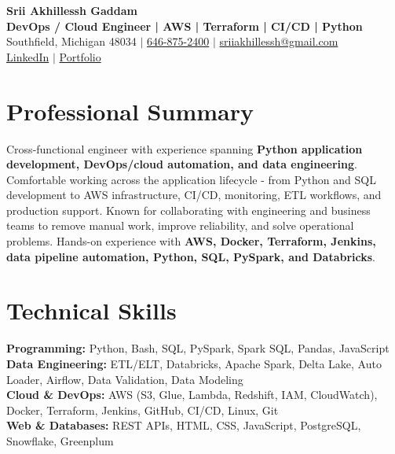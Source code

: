 \documentclass[letterpaper,10pt]{article}
\begin{document}
\fontsize{9.35pt}{10.45pt}\selectfont

\begin{center}
    {\LARGE \textbf{Srii Akhillessh Gaddam}} \\[-1pt]
    \textbf{DevOps / Cloud Engineer | AWS | Terraform | CI/CD | Python} \\[2pt]
    Southfield, Michigan 48034 $|$
    \href{tel:6468752400}{646-875-2400} $|$
    \href{mailto:sriiakhillessh@gmail.com}{sriiakhillessh@gmail.com} \\[1pt]
    \href{https://www.linkedin.com/in/srii-akhiilessh-gaddam-b48668191/}{LinkedIn} $|$
    \href{https://sriiakhillesshg.github.io/portfolio/}{Portfolio}
\end{center}
\vspace{-8pt}

\section{Professional Summary}
\small{Cross-functional engineer with experience spanning \textbf{Python application development, DevOps/cloud automation, and data engineering}. Comfortable working across the application lifecycle - from Python and SQL development to AWS infrastructure, CI/CD, monitoring, ETL workflows, and production support. Known for collaborating with engineering and business teams to remove manual work, improve reliability, and solve operational problems. Hands-on experience with \textbf{AWS, Docker, Terraform, Jenkins, data pipeline automation, Python, SQL, PySpark, and Databricks}.}

\section{Technical Skills}
\small{
\textbf{Programming:} Python, Bash, SQL, PySpark, Spark SQL, Pandas, JavaScript \\
\textbf{Data Engineering:} ETL/ELT, Databricks, Apache Spark, Delta Lake, Auto Loader, Airflow, Data Validation, Data Modeling \\
\textbf{Cloud \& DevOps:} AWS (S3, Glue, Lambda, Redshift, IAM, CloudWatch), Docker, Terraform, Jenkins, GitHub, CI/CD, Linux, Git \\
\textbf{Web \& Databases:} REST APIs, HTML, CSS, JavaScript, PostgreSQL, Snowflake, Greenplum
}
\end{document}
